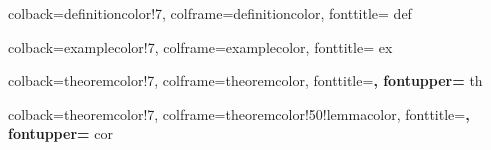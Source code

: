 
%





\theoremstyle{definition}

\newtheorem{ddefinition}[definitioncounter]{}
	{} %
	{colback=definitioncolor!7,
	 colframe=definitioncolor,
	 fonttitle=\bfseries}
	{def} %

\newtheorem{dexample}[examplecounter]{\examplename}
	{\examplename} %
	{colback=examplecolor!7,
	 colframe=examplecolor,
	 fonttitle=\bfseries}
	{ex} %


\theoremstyle{plain}

\newtheorem{dtheorem}[theoremcounter]{\theoremname}
	{\theoremname} %
	{colback=theoremcolor!7,
	 colframe=theoremcolor,
	 fonttitle=\bfseries,
	 fontupper=\slshape}
	{th} %

\newtheorem{dcorollary}[theoremcounter]{\corollaryname}
	{\corollaryname} %
	{colback=theoremcolor!7,
	 colframe=theoremcolor!50!lemmacolor,
	 fonttitle=\bfseries,
	 fontupper=\slshape}
	{cor} %


